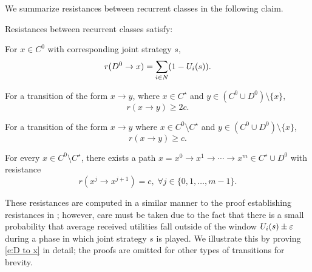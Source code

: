 We summarize resistances between recurrent classes in the following claim. 

\begin{claim}\label{c:resistances}
 Resistances between recurrent classes satisfy:

\noindent For $x \in C^0$ with corresponding joint strategy $s$, 
\begin{equation}\label{e:D to x} r(D^0\to x) = \sum_{i\in N}(1 - U_i(s)).\end{equation}





\noindent For a transition of the form $x\to y$, where $x\in C^\star$ and $y \in (C^0\cup D^0)\setminus \{x\},$ 
\begin{equation}r(x\to y)\geq 2c.\end{equation}


\noindent For a transition of the form $x\to y$  where $x\in C^0\setminus C^\star$ and $y\in (C^0\cup D^0 )\setminus \{x\}$,
\begin{equation}r(x\to y)\geq c.\end{equation}


\noindent For every $x\in C^0\setminus C^\star$, there exists a path 
$x = x^0\to x^1\to\cdots\to x^m\in C^\star\cup D^0$ with resistance 
\begin{equation}r(x^j\to x^{j+1}) = c,\;\forall j\in \{0,1,\ldots,m-1\}.\end{equation}

\end{claim}

These resistances are computed in a similar manner to the proof establishing resistances in \cite{Marden2013c}; however, care must be taken due to the fact that there is a small probability that average received utilities fall outside of the window $U_i(s)\pm\varepsilon$ during a phase in which joint strategy $s$ is played. We illustrate this by proving \eqref{e:D to x} in detail; the proofs are omitted for other types of transitions for brevity.

